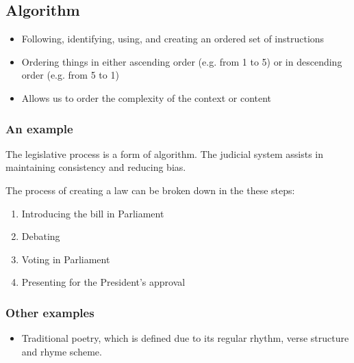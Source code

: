 \documentclass[11pt]{article}
\begin{document}
\subsection{Algorithm}
\label{sec:org0488f7c}
\begin{itemize}
\item Following, identifying, using, and creating an ordered set of instructions
\item Ordering things in either ascending order (e.g. from 1 to 5) or in descending order (e.g. from 5 to 1)
\item Allows us to order the complexity of the context or content
\end{itemize}

\subsubsection{An example}
\label{sec:orgee9765e}
The legislative process is a form of algorithm. The judicial system assists in maintaining consistency and reducing bias.

The process of creating a law can be broken down in the these steps:
\begin{enumerate}
\item Introducing the bill in Parliament
\item Debating
\item Voting in Parliament
\item Presenting for the President's approval
\end{enumerate}

\subsubsection{Other examples}
\label{sec:org30ce630}
\begin{itemize}
\item Traditional poetry, which is defined due to its regular rhythm, verse structure and rhyme scheme.
\end{itemize}

 \newpage
\end{document}
